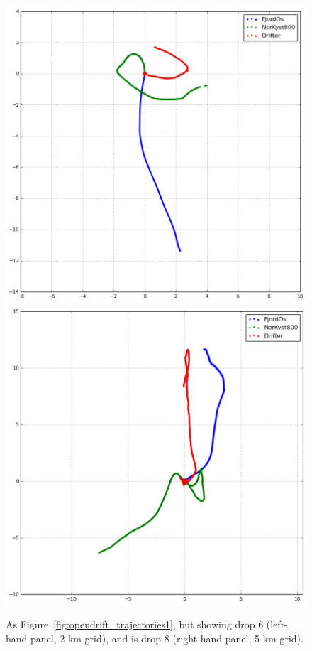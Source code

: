 \begin{figure}[htb]
	\centerline{
		\includegraphics*[width=.5\textwidth]{Figurer/opendrift/skillscore/drop6i12}
		\includegraphics*[width=.5\textwidth]{Figurer/opendrift/skillscore/drop8i1}
		}
	\caption{\small As Figure~\ref{fig:opendrift_trajectories1}, but showing drop 6 (left-hand panel, 2 km grid), and  is drop 8 (right-hand panel, 5 km grid).}
	\label{fig:opendrift_trajectories1a}
\end{figure}

